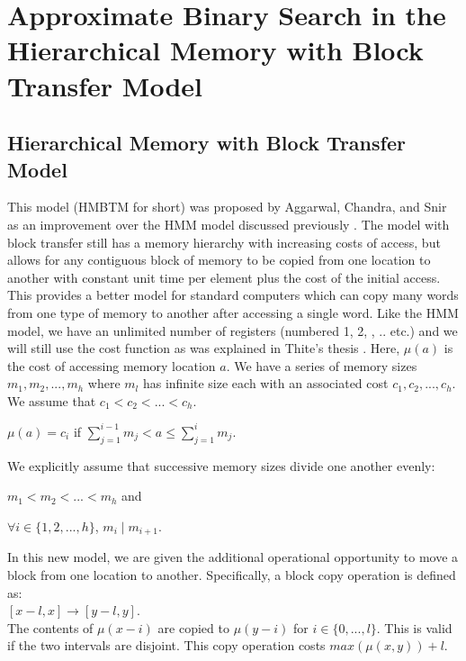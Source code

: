 \documentclass[letterpaper,12pt,titlepage,oneside,final]{book}
\theoremstyle{plain}
\begin{document}
\chapter{Approximate Binary Search in the Hierarchical Memory with Block Transfer Model}\label{Approximate Binary Search in the Hierarchical Memory with Block Transfer Model}

\section{Hierarchical Memory with Block Transfer Model}
This model (HMBTM for short) was proposed by Aggarwal, Chandra, and Snir as an improvement over the HMM model discussed previously \cite{aggarwal1987hierarchical}. The model with block transfer still has a memory hierarchy with increasing costs of access, but allows for any contiguous block of memory to be copied from one location to another with constant unit time per element plus the cost of the initial access. This provides a better model for standard computers which can copy many words from one type of memory to another after accessing a single word. Like the HMM model, we have an unlimited number of registers (numbered 1, 2, , .. etc.) and we will still use the cost function as was explained in Thite's thesis \cite{thite2008optimum}. Here, $\mu (a)$ is the cost of accessing memory location $a$. We have a series of memory sizes $m_1, m_2, ..., m_h$ where $m_l$ has infinite size each with an associated cost $c_1, c_2, ..., c_h$. We assume that $c_1 < c_2 < ... < c_h$. 

\begin{center}$\mu (a) = c_i$ if $\sum_{j = 1}^{i-1}m_j  < a \leq \sum_{j = 1}^{i}m_j$. \end{center}

We explicitly assume that successive memory sizes divide one another evenly:
\begin{center}
$m_1 < m_2 < ... < m_h$ and
\end{center}
\begin{center}
$\forall i \in  \{1,2,...,h\}$, $m_i \mid m_{i+1}$.
\end{center}

In this new model, we are given the additional operational opportunity to move a block from one location to another. Specifically, a block copy operation is defined as: \\
 $[x-l, x] \rightarrow [y-l,y]$. \\
The contents of $\mu(x-i)$ are copied to $\mu(y-i)$ for $i \in \{0,...,l\}$. This is valid if the two intervals are disjoint. This copy operation costs $max(\mu(x,y)) + l$.\\
\end{document}
